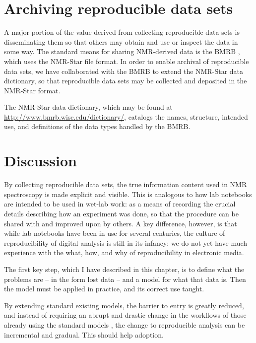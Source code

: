 

\section{Archiving reproducible data sets}
A major portion of the value derived from collecting reproducible data sets
is disseminating them so that others may obtain and use or inspect the data
in some way.  The standard means for sharing NMR-derived data is the BMRB
\cite{bmrb}, which uses the NMR-Star file format.  In order to enable archival
of reproducible data sets, we have collaborated with the BMRB to extend the
NMR-Star data dictionary, so that reproducible data sets may be collected and
deposited in the NMR-Star format.

The NMR-Star data dictionary, which may be found at 
\url{http://www.bmrb.wisc.edu/dictionary/}, catalogs the names, structure,
intended use, and definitions of the data types handled by the BMRB.


\section{Discussion}
By collecting reproducible data sets, the true information content used in
NMR spectroscopy is made explicit and visible.  This is analogous to how lab
notebooks are intended to be used in wet-lab work: as a means of recording
the crucial details describing how an experiment was done, so that the procedure
can be shared with and improved upon by others.  A key difference, however, is
that while lab notebooks have been in use for several centuries, the culture
of reproducibility of digital analysis is still in its infancy: we do not yet
have much experience with the what, how, and why of reproducibility in 
electronic media.

The first key step, which I have described in this chapter, is to define what
the problems are -- in the form lost data -- and a model for what that data is.
Then the model must be applied in practice, and its correct use taught.

By extending standard existing models, the barrier to entry is greatly reduced,
and instead of requiring an abrupt and drastic change in the workflows of those
already using the standard models \cite{bmrb, ccpn}, the change to reproducible
analysis can be incremental and gradual.  This should help adoption.


